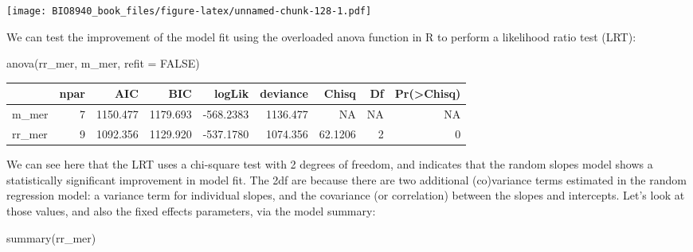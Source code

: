 \documentclass[
  12pt,
]{book}
\newenvironment{Shaded}{\begin{snugshade}}{\end{snugshade}}
\newcommand{\AttributeTok}[1]{\textcolor[rgb]{0.77,0.63,0.00}{#1}}
\newcommand{\ConstantTok}[1]{\textcolor[rgb]{0.00,0.00,0.00}{#1}}
\newcommand{\FunctionTok}[1]{\textcolor[rgb]{0.00,0.00,0.00}{#1}}
\newcommand{\NormalTok}[1]{#1}
\begin{document}
\texttt{[image: BIO8940\_book\_files/figure-latex/unnamed-chunk-128-1.pdf]}

We can test the improvement of the model fit using the overloaded anova function in R to perform a likelihood ratio test (LRT):

\begin{Shaded}
\begin{Highlighting}[]
\FunctionTok{anova}\NormalTok{(rr\_mer, m\_mer, }\AttributeTok{refit =} \ConstantTok{FALSE}\NormalTok{)}
\end{Highlighting}
\end{Shaded}

\begin{tabular}{l|r|r|r|r|r|r|r|r}
\hline
  & npar & AIC & BIC & logLik & deviance & Chisq & Df & Pr(>Chisq)\\
\hline
m\_mer & 7 & 1150.477 & 1179.693 & -568.2383 & 1136.477 & NA & NA & NA\\
\hline
rr\_mer & 9 & 1092.356 & 1129.920 & -537.1780 & 1074.356 & 62.1206 & 2 & 0\\
\hline
\end{tabular}

We can see here that the LRT uses a chi-square test with 2 degrees of freedom, and indicates that the random slopes model shows a statistically significant improvement in model fit. The 2df are because there are two additional (co)variance terms estimated in the random regression model: a variance term for individual slopes, and the covariance (or correlation) between the slopes and intercepts. Let's look at those values, and also the fixed effects parameters, via the model summary:

\begin{Shaded}
\begin{Highlighting}[]
\FunctionTok{summary}\NormalTok{(rr\_mer)}
\end{Highlighting}
\end{Shaded}
\end{document}
